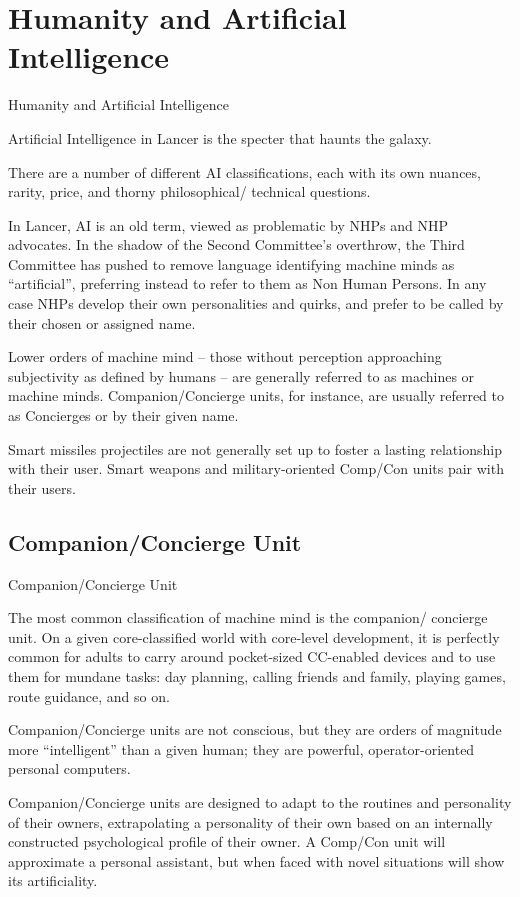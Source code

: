 \section{Humanity and Artificial Intelligence}

Humanity and Artificial Intelligence  

Artificial Intelligence in Lancer is the specter that haunts the galaxy. 
 

There are a number of different AI classifications, each with its own nuances, rarity, price, and  
thorny philosophical/ technical questions. 
 

In Lancer, AI is an old term, viewed as problematic by NHPs and NHP advocates. In the shadow  
of the Second Committee’s overthrow, the Third Committee has pushed to remove language  
identifying machine minds as “artificial”, preferring instead to refer to them as Non Human  
Persons. In any case NHPs develop their own personalities and quirks, and prefer to be called by  
their chosen or assigned name. 
 

Lower orders of machine mind -- those without perception approaching subjectivity as defined  
by humans -- are generally referred to as machines or machine minds. Companion/Concierge  
units, for instance, are usually referred to as Concierges or by their given name. 
 

Smart missiles projectiles are not generally set up to foster a lasting relationship with their user.  
Smart weapons and military-oriented Comp/Con units pair with their users. 
 
\subsection{Companion/Concierge Unit}
Companion/Concierge Unit  

The most common classification of machine mind is the companion/ concierge unit. On a given  
core-classified world with core-level development, it is perfectly common for adults to carry  
around pocket-sized CC-enabled devices and to use them for mundane tasks: day planning,  
calling friends and family, playing games, route guidance, and so on. 
 

Companion/Concierge units are not conscious, but they are orders of magnitude more  
“intelligent” than a given human; they are powerful, operator-oriented personal computers. 
 

Companion/Concierge units are designed to adapt to the routines and personality of their  
owners, extrapolating a personality of their own based on an internally constructed psychological  
profile of their owner. A Comp/Con unit will approximate a personal assistant, but when faced  
with novel situations will show its artificiality. 
 

